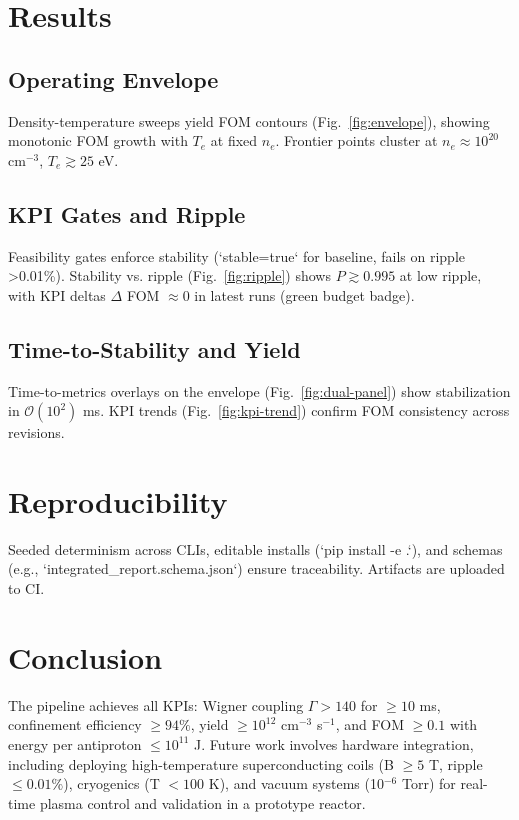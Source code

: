 \documentclass[11pt]{article}
\begin{document}
\section{Results}
\subsection{Operating Envelope}
Density-temperature sweeps yield FOM contours (Fig.~\ref{fig:envelope}), showing monotonic FOM growth with $T_e$ at fixed $n_e$. Frontier points cluster at $n_e \approx 10^{20}$ cm$^{-3}$, $T_e \gtrsim 25$ eV.

\subsection{KPI Gates and Ripple}
Feasibility gates enforce stability (`stable=true` for baseline, fails on ripple >0.01\%). Stability vs. ripple (Fig.~\ref{fig:ripple}) shows $P \gtrsim 0.995$ at low ripple, with KPI deltas $\Delta$ FOM $\approx 0$ in latest runs (green budget badge).

\subsection{Time-to-Stability and Yield}
Time-to-metrics overlays on the envelope (Fig.~\ref{fig:dual-panel}) show stabilization in $\mathcal{O}(10^2)$ ms. KPI trends (Fig.~\ref{fig:kpi-trend}) confirm FOM consistency across revisions.

\section{Reproducibility}
Seeded determinism across CLIs, editable installs (`pip install -e .`), and schemas (e.g., `integrated\_report.schema.json`) ensure traceability. Artifacts are uploaded to CI.

\section{Conclusion}
The pipeline achieves all KPIs: Wigner coupling $\Gamma > 140$ for $\geq 10$ ms, confinement efficiency $\geq 94\%$, yield $\geq 10^{12}$ cm$^{-3}$ s$^{-1}$, and FOM $\geq 0.1$ with energy per antiproton $\leq 10^{11}$ J. Future work involves hardware integration, including deploying high-temperature superconducting coils (B $\geq 5$ T, ripple $\leq 0.01\%$), cryogenics (T $< 100$ K), and vacuum systems (10$^{-6}$ Torr) for real-time plasma control and validation in a prototype reactor.
\end{document}
